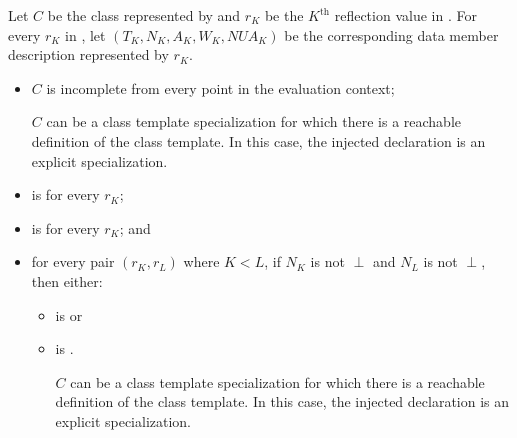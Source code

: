 \begin{itemdescr}
\pnum
Let $C$ be the class represented by 
and $r_K$ be the $K^\text{th}$ reflection value in .
For every $r_K$ in ,
let $(T_K, N_K, A_K, W_K, \mathit{NUA}_K)$ be
the corresponding data member description represented by $r_K$.

\pnum
\constantwhen
\begin{itemize}
\item
  $C$ is incomplete from every point in the evaluation context;
  \begin{note}
  $C$ can be a class template specialization
  for which there is a reachable definition of the class template.
  In this case,
  the injected declaration is an explicit specialization.
  \end{note}
\item
   is  for every $r_K$;
\item
   is  for every $r_K$; and
\item
  for every pair $(r_K, r_L)$ where $K < L$,
  if $N_K$ is not $\perp$ and $N_L$ is not $\perp$,
  then either:
  \begin{itemize}
  \item
     is  or
  \item
     is .
    \begin{note}
    $C$ can be a class template specialization
    for which there is a reachable definition of the class template.
    In this case,
    the injected declaration is an explicit specialization.
    \end{note}
  \end{itemize}
\end{itemize}


\end{itemdescr}
